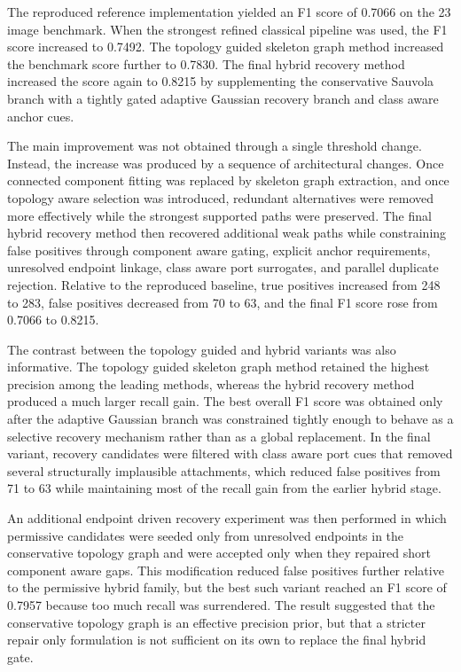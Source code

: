 The reproduced reference implementation yielded an F1 score of 0.7066 on the 23 image benchmark. When the strongest refined classical pipeline was used, the F1 score increased to 0.7492. The topology guided skeleton graph method increased the benchmark score further to 0.7830. The final hybrid recovery method increased the score again to 0.8215 by supplementing the conservative Sauvola branch with a tightly gated adaptive Gaussian recovery branch and class aware anchor cues.

\begin{table}[H]
\centering
\caption{Benchmark comparison on 23 hand drawn circuit schematic images with 300 annotated wire segments.}

\label{tab:mainresults}
\end{table}

The main improvement was not obtained through a single threshold change. Instead, the increase was produced by a sequence of architectural changes. Once connected component fitting was replaced by skeleton graph extraction, and once topology aware selection was introduced, redundant alternatives were removed more effectively while the strongest supported paths were preserved. The final hybrid recovery method then recovered additional weak paths while constraining false positives through component aware gating, explicit anchor requirements, unresolved endpoint linkage, class aware port surrogates, and parallel duplicate rejection. Relative to the reproduced baseline, true positives increased from 248 to 283, false positives decreased from 70 to 63, and the final F1 score rose from 0.7066 to 0.8215.

The contrast between the topology guided and hybrid variants was also informative. The topology guided skeleton graph method retained the highest precision among the leading methods, whereas the hybrid recovery method produced a much larger recall gain. The best overall F1 score was obtained only after the adaptive Gaussian branch was constrained tightly enough to behave as a selective recovery mechanism rather than as a global replacement. In the final variant, recovery candidates were filtered with class aware port cues that removed several structurally implausible attachments, which reduced false positives from 71 to 63 while maintaining most of the recall gain from the earlier hybrid stage.

An additional endpoint driven recovery experiment was then performed in which permissive candidates were seeded only from unresolved endpoints in the conservative topology graph and were accepted only when they repaired short component aware gaps. This modification reduced false positives further relative to the permissive hybrid family, but the best such variant reached an F1 score of 0.7957 because too much recall was surrendered. The result suggested that the conservative topology graph is an effective precision prior, but that a stricter repair only formulation is not sufficient on its own to replace the final hybrid gate.

